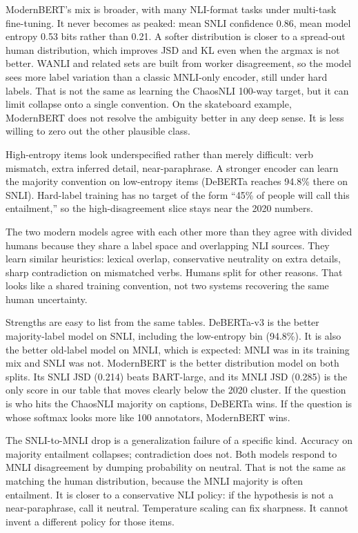 \documentclass[11pt,a4paper]{article}
\begin{document}
ModernBERT's mix is broader, with many NLI-format tasks under multi-task fine-tuning. It never becomes as peaked: mean SNLI confidence 0.86, mean model entropy 0.53 bits rather than 0.21. A softer distribution is closer to a spread-out human distribution, which improves JSD and KL even when the argmax is not better. WANLI and related sets are built from worker disagreement, so the model sees more label variation than a classic MNLI-only encoder, still under hard labels. That is not the same as learning the ChaosNLI 100-way target, but it can limit collapse onto a single convention. On the skateboard example, ModernBERT does not resolve the ambiguity better in any deep sense. It is less willing to zero out the other plausible class.

High-entropy items look underspecified rather than merely difficult: verb mismatch, extra inferred detail, near-paraphrase. A stronger encoder can learn the majority convention on low-entropy items (DeBERTa reaches 94.8\% there on SNLI). Hard-label training has no target of the form ``45\% of people will call this entailment,'' so the high-disagreement slice stays near the 2020 numbers.

The two modern models agree with each other more than they agree with divided humans because they share a label space and overlapping NLI sources. They learn similar heuristics: lexical overlap, conservative neutrality on extra details, sharp contradiction on mismatched verbs. Humans split for other reasons. That looks like a shared training convention, not two systems recovering the same human uncertainty.

Strengths are easy to list from the same tables. DeBERTa-v3 is the better majority-label model on SNLI, including the low-entropy bin (94.8\%). It is also the better old-label model on MNLI, which is expected: MNLI was in its training mix and SNLI was not. ModernBERT is the better distribution model on both splits. Its SNLI JSD (0.214) beats BART-large, and its MNLI JSD (0.285) is the only score in our table that moves clearly below the 2020 cluster. If the question is who hits the ChaosNLI majority on captions, DeBERTa wins. If the question is whose softmax looks more like 100 annotators, ModernBERT wins.

The SNLI-to-MNLI drop is a generalization failure of a specific kind. Accuracy on majority entailment collapses; contradiction does not. Both models respond to MNLI disagreement by dumping probability on neutral. That is not the same as matching the human distribution, because the MNLI majority is often entailment. It is closer to a conservative NLI policy: if the hypothesis is not a near-paraphrase, call it neutral. Temperature scaling can fix sharpness. It cannot invent a different policy for those items.
\end{document}
